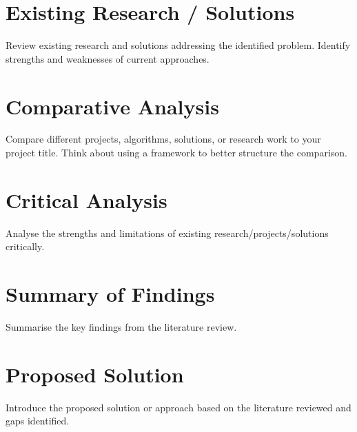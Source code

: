 \section{Existing Research / Solutions}
Review existing research and solutions addressing the identified problem.
Identify strengths and weaknesses of current approaches.

\section{Comparative Analysis}
Compare different projects, algorithms, solutions, or research work to your project title. Think about using a framework to better structure the comparison.

\section{Critical Analysis}
Analyse the strengths and limitations of existing research/projects/solutions critically.

\section{Summary of Findings}
Summarise the key findings from the literature review.

\section{Proposed Solution}
Introduce the proposed solution or approach based on the literature reviewed and gaps identified.
